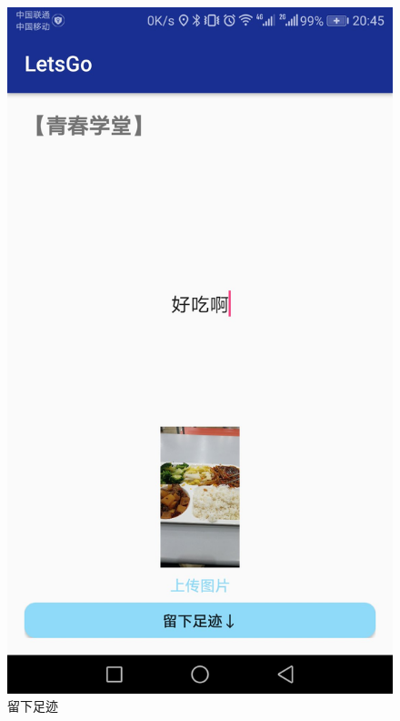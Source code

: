 \documentclass[UTF8]{article}
\begin{document}
\begin{figure}[H]
\begin{minipage}[t]{0.33\textwidth}
    \includegraphics[width=\textwidth]{images/demo_post.jpeg}
    \caption{留下足迹}
\end{minipage}
\begin{minipage}[t]{0.33\textwidth}

\end{minipage}
\end{figure}
\end{document}
